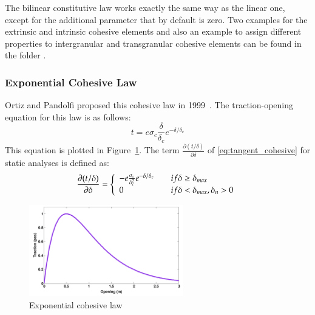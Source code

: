 The bilinear constitutive law works exactly the same way as the linear
one, except for the additional parameter  that by
default is zero. Two examples for the extrinsic and intrinsic cohesive
elements and also an example to assign different properties to
intergranular and transgranular cohesive elements can be found in
the folder .

\subsubsection{Exponential Cohesive Law}

Ortiz and Pandolfi proposed this cohesive law in 1999~\cite{ortiz1999}.  The
traction-opening equation for this law is as follows:
\begin{equation}
  \label{eq:exponential_law}
  t = e \sigma_c \frac{\delta}{\delta_c}e^{-\delta/ \delta_c}
\end{equation}
This equation is plotted in Figure~\ref{fig:smm:CL:ECL}. The term
$\frac{\partial{(t/\delta)}}{\partial{\delta}}$ of
\eqref{eq:tangent_cohesive} for static analyses is defined as:
\begin{equation}
  \frac{\partial{(t/ \delta)}}{\partial{\delta}} = \left\{\begin{array} {l l}
      -e  \frac{\sigma_c}{\delta_c^2  }e^{-\delta  /  \delta_c} &  \quad  if
      \delta \geq \delta_{max}\\
      0 & \quad if \delta < \delta_{max}, \delta_n > 0
    \end{array} \right.
\end{equation}


\begin{figure}[!htb]
  \begin{center}
    \includegraphics[width=0.6\textwidth,keepaspectratio=true]{figures/cohesive_exponential.pdf}
    \caption{Exponential cohesive law}
    \label{fig:smm:CL:ECL}
  \end{center}
\end{figure}


